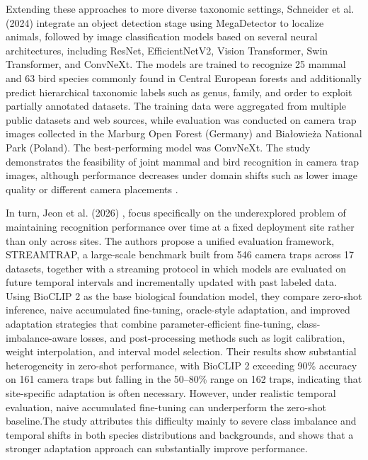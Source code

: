 Extending these approaches to more diverse taxonomic settings, Schneider et al. (2024) \citep{schneider2024recognition} integrate an object detection stage using MegaDetector to localize animals, followed by image classification models based on several neural architectures, including ResNet, EfficientNetV2, Vision Transformer, Swin Transformer, and ConvNeXt. The models are trained to recognize 25 mammal and 63 bird species commonly found in Central European forests and additionally predict hierarchical taxonomic labels such as genus, family, and order to exploit partially annotated datasets. The training data were aggregated from multiple public datasets and web sources, while evaluation was conducted on camera trap images collected in the Marburg Open Forest (Germany) and Białowieża National Park (Poland). The best-performing model was ConvNeXt. The study demonstrates the feasibility of joint mammal and bird recognition in camera trap images, although performance decreases under domain shifts such as lower image quality or different camera placements \citep{schneider2024recognition}.

In turn, Jeon et al. (2026) \citep{jeon2026lessons}, focus specifically on the underexplored problem of maintaining recognition performance over time at a fixed deployment site rather than only across sites. The authors propose a unified evaluation framework, STREAMTRAP, a large-scale benchmark built from 546 camera traps across 17 datasets, together with a streaming protocol in which models are evaluated on future temporal intervals and incrementally updated with past labeled data. Using BioCLIP 2 as the base biological foundation model, they compare zero-shot inference, naive accumulated fine-tuning, oracle-style adaptation, and improved adaptation strategies that combine parameter-efficient fine-tuning, class-imbalance-aware losses, and post-processing methods such as logit calibration, weight interpolation, and interval model selection. Their results show substantial heterogeneity in zero-shot performance, with BioCLIP 2 exceeding 90\% accuracy on 161 camera traps but falling in the 50–80\% range on 162 traps, indicating that site-specific adaptation is often necessary. However, under realistic temporal evaluation, naive accumulated fine-tuning can underperform the zero-shot baseline.The study attributes this difficulty mainly to severe class imbalance and temporal shifts in both species distributions and backgrounds, and shows that a stronger adaptation approach can substantially improve performance.


